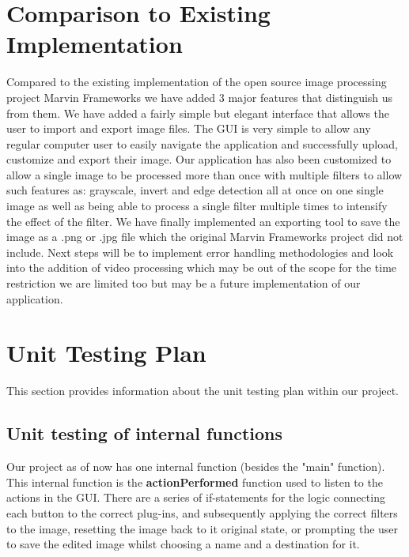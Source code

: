 \documentclass[12pt, titlepage]{article}
\begin{document}
\section{Comparison to Existing Implementation}	
			Compared to the existing implementation of the open source image processing project Marvin Frameworks we have added 3 major features that distinguish us from them. We have added a fairly simple but elegant interface that allows the user to import and export image files. The GUI is very simple to allow any regular computer user to easily navigate the application and successfully upload, customize and export their image.  Our application has also been customized to allow a single image to be processed more than once with multiple filters to allow such features as: grayscale, invert and edge detection all at once on one single image as well as being able to process a single filter multiple times to intensify the effect of the filter. We have finally implemented an exporting tool to save the image as a .png or .jpg file which the original Marvin Frameworks project did not include. Next steps will be to implement error handling methodologies and look into the addition of video processing which may be out of the scope for the time restriction we are limited too but may be a future implementation of our application.
\section{Unit Testing Plan}

This section provides information about the unit testing plan within our project.
		
\subsection{Unit testing of internal functions}

Our project as of now has one internal function (besides the "main" function).
This internal function is the \textbf{actionPerformed} function used to listen to the actions in the GUI. There are a series of if-statements for the logic connecting each button to the correct plug-ins, and subsequently applying the correct filters to the image, resetting the image back to it original state, or prompting the user to save the edited image whilst choosing a name and a destination for it.
\end{document}
